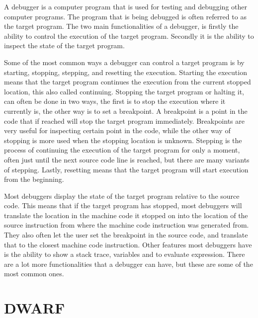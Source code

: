 

A debugger is a computer program that is used for testing and debugging other computer programs.
The program that is being debugged is often referred to as the target program.
The two main functionalities of a debugger, is firstly the ability to control the execution of the target program.
Secondly it is the ability to inspect the state of the target program.


Some of the most common ways a debugger can control a target program is by starting, stopping, stepping, and resetting the execution.
Starting the execution means that the target program continues the execution from the current stopped location, this also called continuing.
Stopping the target program or halting it, can often be done in two ways, the first is to stop the execution where it currently is, the other way is to set a breakpoint.
A breakpoint is a point in the code that if reached will stop the target program immediately.
Breakpoints are very useful for inspecting certain point in the code, while the other way of stopping is more used when the stopping location is unknown.
Stepping is the process of continuing the execution of the target program for only a moment, often just until the next source code line is reached, but there are many variants of stepping.
Lastly, resetting means that the target program will start execution from the beginning.


Most debuggers display the state of the target program relative to the source code.
This means that if the target program has stopped, most debuggers will translate the location in the machine code it stopped on into the location of the source instruction from where the machine code instruction was generated from.
They also often let the user set the breakpoint in the source code, and translate that to the closest machine code instruction.
Other features most debuggers have is the ability to show a stack trace, variables and to evaluate expression.
There are a lot more functionalities that a debugger can have, but these are some of the most common ones.



\section{DWARF}
\label{sec:dwarf}
 
